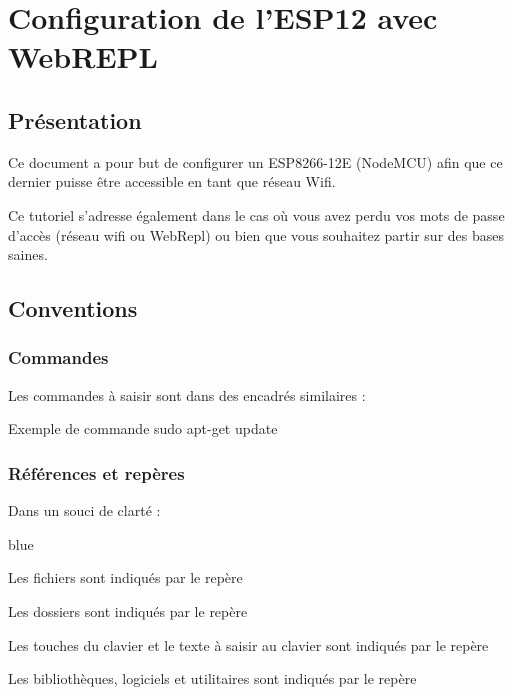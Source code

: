 \chapter{Configuration de l'ESP12 avec WebREPL}     

\section{Présentation}

Ce document a pour but de configurer un ESP8266-12E (NodeMCU) afin que ce dernier puisse être accessible en tant que réseau Wifi.

Ce tutoriel s'adresse également dans le cas où vous avez perdu vos mots de passe d'accès (réseau wifi ou WebRepl) ou bien que vous souhaitez partir sur des bases saines.\\



\section{Conventions}


\subsection{Commandes}

Les commandes à saisir sont dans des encadrés similaires : \\
\begin{Bash}{Exemple de commande}
sudo apt-get update
\end{Bash}

\subsection{Références et repères}

Dans un souci de clarté : 

\begin{items}{blue}{\Triangle}
	\item Les fichiers sont indiqués par le repère 
	\item Les dossiers sont indiqués par le repère 
	\item Les touches du clavier et le texte à saisir au clavier sont indiqués par le repère 
	\item Les bibliothèques, logiciels et utilitaires sont indiqués par le repère 
\end{items}

